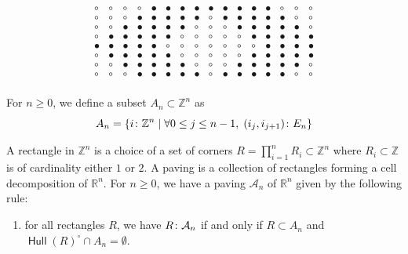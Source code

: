 \documentclass{article}
\DeclareMathOperator{\Hull}{\mathsf{Hull}}
\begin{document}
\[\begin{array}{cccccccccccccccc}
\circ & \circ & \circ & \circ & \bullet & \bullet & \bullet & \bullet & \bullet & \bullet & \bullet & \bullet & \bullet & \circ & \circ & \circ \\
\circ & \circ & \circ & \bullet & \bullet & \bullet & \bullet & \bullet & \circ & \bullet & \bullet & \bullet & \bullet & \bullet & \circ & \circ \\
\circ & \circ & \bullet & \bullet & \bullet & \bullet & \bullet & \circ & \circ & \circ & \bullet & \bullet & \bullet & \bullet & \bullet & \circ \\
\circ & \bullet & \bullet & \bullet & \bullet & \bullet & \circ & \circ & \circ & \circ & \circ & \bullet & \bullet & \bullet & \bullet & \bullet \\
\bullet & \bullet & \bullet & \bullet & \bullet & \circ & \circ & \circ & \circ & \circ & \circ & \circ & \bullet & \bullet & \bullet & \bullet \\
\circ & \bullet & \bullet & \bullet & \bullet & \bullet & \circ & \circ & \circ & \circ & \circ & \bullet & \bullet & \bullet & \bullet & \bullet \\
\circ & \circ & \bullet & \bullet & \bullet & \bullet & \bullet & \circ & \circ & \circ & \bullet & \bullet & \bullet & \bullet & \bullet & \circ \\
\circ & \circ & \circ & \bullet & \bullet & \bullet & \bullet & \bullet & \circ & \bullet & \bullet & \bullet & \bullet & \bullet & \circ & \circ \\
\end{array}\]


\begin{definition}
    For $n \geq 0$, we define a subset $A_n \subset \mathbb{Z}^n$ as
    \[
        A_n = \{i \inset \mathbb{Z}^n \mid \forall 0 \leq j \leq n-1, \; (i_j, i_{j+1}) \inset E_n\}
    \]
\end{definition}

\begin{definition}[Paving]
    A rectangle in $\mathbb{Z}^n$ is a choice of a set of corners $R = \prod_{i = 1}^n R_i \subset \mathbb{Z}^n$ where $R_i \subset \mathbb{Z}$ is of cardinality either $1$ or $2$.
    A paving is a collection of rectangles forming a cell decomposition of $\mathbb{R}^n$.
    For $n \geq 0$, we have a paving $\mathcal{A}_n$ of $\mathbb{R}^n$ given by the following rule:
    \begin{enumerate}
        \item for all rectangles $R$, we have $R \inset \mathcal{A}_n$ if and only if $R \subset A_n$ and $\Hull(R)^\circ \cap A_n = \emptyset$.
    \end{enumerate}
\end{definition}
\end{document}
